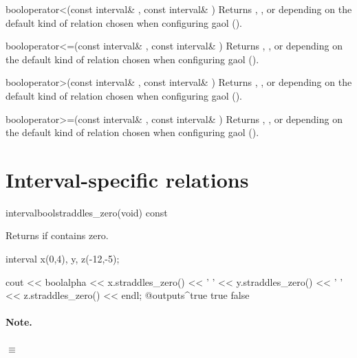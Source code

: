 \documentclass{manual}
\begin{document}
\begin{deffun}{bool}{operator<}{(const interval\& , const interval\& )}
  Returns ,
  , or
   depending on the default kind of
  relation chosen when configuring gaol ().
\end{deffun}

\begin{deffun}{bool}{operator<=}{(const interval\& , const interval\& )}
  Returns ,
  , or
   depending on the default kind of
  relation chosen when configuring gaol ().
\end{deffun}

\begin{deffun}{bool}{operator>}{(const interval\& , const interval\& )}
  Returns ,
  , or
   depending on the default kind of
  relation chosen when configuring gaol ().
\end{deffun}

\begin{deffun}{bool}{operator>=}{(const interval\& , const interval\& )}
  Returns ,
  , or
   depending on the default kind of
  relation chosen when configuring gaol ().
\end{deffun}


\section{Interval-specific relations}

\begin{defmethod}{interval}{bool}{straddles\_zero}{(void) const}
  \begin{operation}
  \end{operation}
Returns  if  contains zero.
\begin{example}
interval x(0,4), y, z(-12,-5);

cout << boolalpha << x.straddles_zero() << ' '
     << y.straddles_zero() << ' '
     << z.straddles_zero() << endl;
@outputs^true true false~
\end{example}

\paragraph*{Note.}  $\equiv$ 
\end{defmethod}
\end{document}
